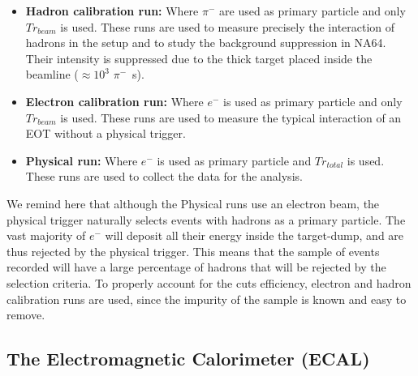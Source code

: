 \begin{itemize}
\item \textbf{Hadron calibration run:} Where $\pi^-$ are used as primary particle and only $Tr_{beam}$ is used. These runs are used to measure precisely the interaction of hadrons in the setup and to study the background suppression in NA64. Their intensity is suppressed due to the thick target placed inside the beamline ($\approx 10^{3}$ $\pi^-$\si{\per\second}).
\item \textbf{Electron calibration run:} Where $e^-$ is used as primary particle and only $Tr_{beam}$ is used. These runs are used to measure the typical interaction of an EOT without a physical trigger. 
\item \textbf{Physical run:} Where $e^-$ is used as primary particle and $Tr_{total}$ is used. These runs are used to collect the data for the analysis. 
\end{itemize}

We remind here that although the Physical runs use an electron beam, the physical trigger naturally selects events with hadrons as a primary particle. The vast majority of $e^-$ will deposit all their energy inside the target-dump, and are thus rejected by the physical trigger. This means that the sample of events recorded will have a large percentage of hadrons that will be rejected by the selection criteria. To properly account for the cuts efficiency, electron and hadron calibration runs are used, since the impurity of the sample is known and easy to remove.

\subsection{The Electromagnetic Calorimeter (ECAL)}
\label{ch2:sec:detectors-ecal}

